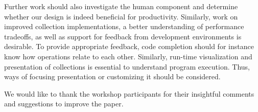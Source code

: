 \documentclass[sigconf, authorversion]{acmart}
\begin{document}
Further work should also investigate the human component and determine whether
our design is indeed beneficial for productivity.
Similarly, work on improved collection implementations,
a better understanding of performance tradeoffs,
as well as support for feedback from development environments is desirable. 
To provide appropriate feedback,
code completion should for instance know how operations relate to each other.
Similarly, run-time visualization and presentation of collections
is essential to understand program execution.
Thus, ways of focusing presentation or customizing it should be considered.

%
%





\begin{acks}
We would like to thank the workshop participants for their insightful comments
and suggestions to improve the paper.
\end{acks}


{\balance


}
\end{document}
